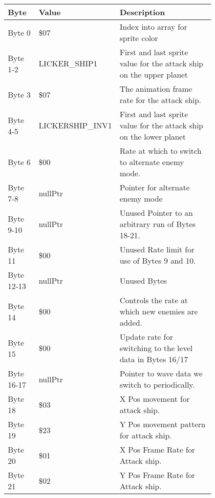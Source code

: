 \begin{figure}[H]
{\begin{adjustbox}{width=12cm}
\begin{tabular}{lll}
\toprule
 Byte       & Value                     & Description                                                         \\
\midrule
 Byte 0     & \$07                       & Index into array for sprite color                                   \\
 Byte 1-2   & LICKER\_SHIP1              & First and last sprite value for the attack ship on the upper planet \\
 Byte 3     & \$07                       & The animation frame rate for the attack ship.                       \\
 Byte 4-5   & LICKERSHIP\_INV1           & First and last sprite value for the attack ship on the lower planet \\
 Byte 6     & \$00                       & Rate at which to switch to alternate enemy mode.                    \\
 Byte 7-8   & nullPtr                   & Pointer for alternate enemy mode                                    \\
 Byte 9-10  & nullPtr                   & Unused Pointer to an arbitrary run of Bytes 18-21.                  \\
 Byte 11    & \$00                       & Unused Rate limit for use of Bytes 9 and 10.                        \\
 Byte 12-13 & nullPtr                   & Unused Bytes                                                        \\
 Byte 14    & \$00                       & Controls the rate at which new enemies are added.                   \\
 Byte 15    & \$00                       & Update rate for switching to the level data in Bytes 16/17          \\
 Byte 16-17 & nullPtr                   & Pointer to wave data we switch to periodically.                     \\
 Byte 18    & \$03                       & X Pos movement for attack ship.                                     \\
 Byte 19    & \$23                       & Y Pos movement pattern for attack ship.                             \\
 Byte 20    & \$01                       & X Pos Frame Rate for Attack ship.                                   \\
 Byte 21    & \$02                       & Y Pos Frame Rate for Attack ship.                                   \\

\end{tabular}
\end{adjustbox}}
\end{figure}
